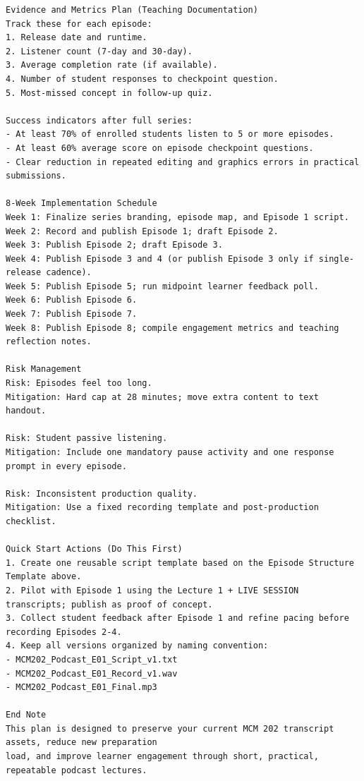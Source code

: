 {\begin{Verbatim}
Evidence and Metrics Plan (Teaching Documentation)
Track these for each episode:
1. Release date and runtime.
2. Listener count (7-day and 30-day).
3. Average completion rate (if available).
4. Number of student responses to checkpoint question.
5. Most-missed concept in follow-up quiz.

Success indicators after full series:
- At least 70% of enrolled students listen to 5 or more episodes.
- At least 60% average score on episode checkpoint questions.
- Clear reduction in repeated editing and graphics errors in practical submissions.

8-Week Implementation Schedule
Week 1: Finalize series branding, episode map, and Episode 1 script.
Week 2: Record and publish Episode 1; draft Episode 2.
Week 3: Publish Episode 2; draft Episode 3.
Week 4: Publish Episode 3 and 4 (or publish Episode 3 only if single-release cadence).
Week 5: Publish Episode 5; run midpoint learner feedback poll.
Week 6: Publish Episode 6.
Week 7: Publish Episode 7.
Week 8: Publish Episode 8; compile engagement metrics and teaching reflection notes.

Risk Management
Risk: Episodes feel too long.
Mitigation: Hard cap at 28 minutes; move extra content to text handout.

Risk: Student passive listening.
Mitigation: Include one mandatory pause activity and one response prompt in every episode.

Risk: Inconsistent production quality.
Mitigation: Use a fixed recording template and post-production checklist.

Quick Start Actions (Do This First)
1. Create one reusable script template based on the Episode Structure Template above.
2. Pilot with Episode 1 using the Lecture 1 + LIVE SESSION transcripts; publish as proof of concept.
3. Collect student feedback after Episode 1 and refine pacing before recording Episodes 2-4.
4. Keep all versions organized by naming convention:
- MCM202_Podcast_E01_Script_v1.txt
- MCM202_Podcast_E01_Record_v1.wav
- MCM202_Podcast_E01_Final.mp3

End Note
This plan is designed to preserve your current MCM 202 transcript assets, reduce new preparation
load, and improve learner engagement through short, practical, repeatable podcast lectures.
\end{Verbatim}
}
